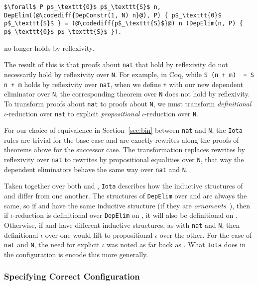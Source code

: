 \begin{lstlisting}
$\forall$ P p$_\texttt{0}$ p$_\texttt{S}$ n, DepElim((@\codediff{DepConstr(1, N) n}@), P) { p$_\texttt{0}$ p$_\texttt{S}$ } = (@\codediff{p$_\texttt{S}$}@) n (DepElim(n, P) { p$_\texttt{0}$ p$_\texttt{S}$ }).
\end{lstlisting}
no longer holds by reflexivity.

The result of this is that proofs about \lstinline{nat} that hold by reflexivity
do not necessarily hold by reflexivity over \lstinline{N}. For example, in Coq,
while \lstinline{S (n + m)  = S n + m} holds by reflexivity over \lstinline{nat},
when we define \lstinline{+} with our new dependent eliminator over \lstinline{N},
the corresponding theorem over \lstinline{N} does not hold by reflexivity.
To transform proofs about \lstinline{nat} to proofs about \lstinline{N}, we must transform \textit{definitional} $\iota$-reduction over \lstinline{nat}
to explicit \textit{propositional} $\iota$-reduction over \lstinline{N}.

For our choice of equivalence in Section~\ref{sec:bin} between \lstinline{nat} and \lstinline{N}, the \lstinline{Iota} rules are trivial
for the base case and are exactly rewrites along the proofs of theorems above for the successor case.
The transformation replaces rewrites by reflexivity over \lstinline{nat} to rewrites by propositional equalities over \lstinline{N},
that way the dependent eliminators behave the same way over \lstinline{nat} and \lstinline{N}.

Taken together over both \A and \B, \lstinline{Iota} describes how the inductive structures of \A and \B differ from one another.
The structures of \lstinline{DepElim} over \A and \B are always the same, so if \A and \B have the same 
inductive structure (if they are \textit{ornaments}~\cite{mcbride}),
then if $\iota$-reduction is definitional over \lstinline{DepElim} on \A, it will also be definitional on \B.
Otherwise, if \A and \B have different inductive structures, as with \lstinline{nat} and \lstinline{N},
then definitional $\iota$ over one would lift to propositional $\iota$ over the other.
For the case of \lstinline{nat} and \lstinline{N},
the need for explicit $\iota$ was noted as far back as \citet{magaud2000changing}.
What \lstinline{Iota} does in the configuration is encode this more generally.

\subsubsection{Specifying Correct Configuration}
\label{sec:art}

